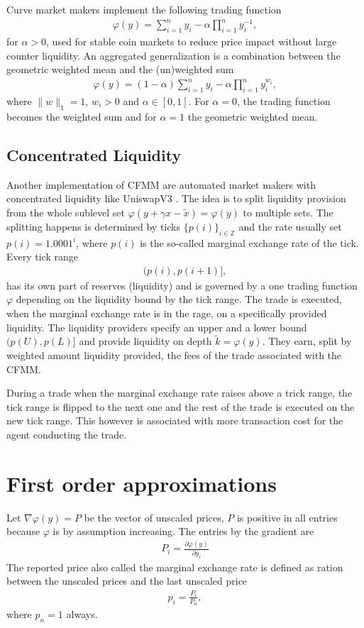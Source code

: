 Curve \cite{stableswap} market makers implement the following trading function
\begin{align}
    \varphi(y) =\sum_{i=1}^{n}y_i  - \alpha \prod_{i=1}^{n} y_i^{-1} ,
\end{align}
for $\alpha > 0$, used for stable coin markets to reduce price impact without
large counter liquidity. An aggregated generalization is a combination between
the geometric weighted mean and the (un)weighted sum
\begin{align}
    \varphi(y) =(1-\alpha)\sum_{i=1}^{n}y_i  - \alpha \prod_{i=1}^{n} y_i^{w_i},
\end{align}
where $\| w\|_1 = 1$, $w_i > 0$ and $\alpha \in [0,1]$. For $\alpha = 0$, the
trading function becomes the weighted sum and for $\alpha = 1$ the geometric
weighted mean.

\subsection{Concentrated Liquidity}
Another implementation of CFMM are automated market makers with concentrated
liquidity like UniswapV3 \cite{uniswapv3_paper}. The idea is to split
liquidity provision from the whole sublevel set
$\varphi(y +\gamma x-\tilde{x}) =\varphi(y)$ to multiple sets. The splitting
happens is determined by ticks $\{p(i)\}_{i \in \mathbb{Z} }$ and the rate
usually set $p(i) = 1.0001^{i}$, where $p(i)$ is the so-called marginal
exchange rate of the tick. Every tick range
\begin{align}
    (p(i), p(i+1)],
\end{align}
has its own part of reserves (liquidity) and is governed by a one trading
function $\varphi$ depending on the liquidity bound by the tick range. The
trade is executed, when the marginal exchange rate is in the rage, on a
specifically provided liquidity. The liquidity providers specify an upper and
a lower bound $(p(U), p(L)]$ and provide liquidity on depth $\tilde{k} =
\varphi(y)$. They earn, split by weighted amount liquidity provided, the fees
of the trade associated with the CFMM.

During a trade when the marginal exchange rate raises above a trick range,
the tick range is flipped to the next one and the rest of the trade is
executed on the new tick range. This however is associated with more
transaction cost for the agent conducting the trade.
\section{First order approximations\label{sec: first_order_approx}}
Let $\nabla \varphi(y) = P$ be the vector of unscaled prices, $P$ is positive
in all entries because $\varphi$ is by assumption increasing. The entries by
the gradient are
\begin{align}
    P_i = \frac{\partial \varphi(y)}{\partial y_i}
\end{align}
The reported price also called the marginal exchange rate is defined as
ration between the unscaled prices and the last unscaled price
\begin{align}
    p_i = \frac{P_i}{P_n},
\end{align}
where $p_n = 1$ always.

